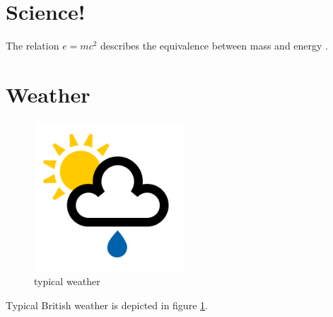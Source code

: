 \documentclass[12pt]{article}  %
\begin{document}
\section{Science!}
The relation $e=mc^2$ describes the equivalence between mass and energy \citep{massenergy}.


\section{Weather}
\begin{figure}[h]
	\centering
	\includegraphics[width=0.5\textwidth]{showers}
	\caption{typical weather}
	\label{fig:weather}
\end{figure}

Typical British weather is depicted in figure \ref{fig:weather}.



\end{document}
